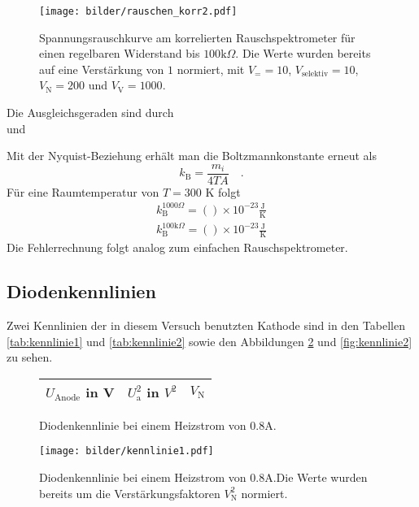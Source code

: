 	\begin{figure}[h]
			\centering
			\texttt{[image: bilder/rauschen\_korr2.pdf]}
			\caption{Spannungsrauschkurve am korrelierten Rauschspektrometer für einen
			regelbaren Widerstand bis $100\text{k}\Omega$. Die Werte wurden bereits auf eine
			Verstärkung von 	$1$ normiert, mit $V_= =10$, $V_\text{selektiv}=10$, $V_\text{N}=200$ und
			$V_\text{V}=1000$. }
			\label{fig:rauschen_korr2}
	\end{figure}

		Die Ausgleichsgeraden sind durch
		\begin{equation}
			
		\end{equation}
		und
		\begin{equation}
			
		\end{equation}

		Mit der Nyquist-Beziehung erhält man die Boltzmannkonstante erneut als
		\begin{equation}
		k_\text{B}=\frac{m_i}{4 T A} \quad .
		\end{equation}
 		Für eine Raumtemperatur von $T=300$ K folgt
		\begin{align}
		k_\text{B}^{1000\Omega}			=  () \times 10^{-23}\frac{\text{J}}
																			{\text{K}} \\
		k_\text{B}^{100\text{k}\Omega}	=  () \times 10^{-23}\frac{\text{J}}
																			{\text{K}}
		\end{align}
		Die Fehlerrechnung folgt analog zum einfachen Rauschspektrometer.



\clearpage
\subsection{Diodenkennlinien}
	Zwei Kennlinien der in diesem Versuch benutzten Kathode sind in
	den Tabellen \ref{tab:kennlinie1} und \ref{tab:kennlinie2} sowie
	den Abbildungen \ref{fig:kennlinie1} und \ref{fig:kennlinie2} zu
	sehen.

	\begin{figure}[htbp]
	\begin{minipage}{0.4\textwidth}
			\centering
			\begin{tabular}{ccc}
				\toprule \midrule
				$U_\text{Anode}$ in V & $U_\text{a}^2$ in $V^2$
				& $V_\text{N}$\\
				\midrule
				
				\midrule \bottomrule
			\end{tabular}
			\caption{Diodenkennlinie bei einem Heizstrom von
			$0.8$A.}
			\label{tab:kennlinie1}
	\end{minipage}
	\hfill
	\begin{minipage}{0.6\textwidth}
			\centering
			\texttt{[image: bilder/kennlinie1.pdf]}
			\caption{Diodenkennlinie bei einem Heizstrom von
			$0.8$A.Die Werte wurden bereits um die
            Verstärkungsfaktoren $V_\text{N}^2$ normiert. }
			\label{fig:kennlinie1}
	\end{minipage}
	\end{figure}



